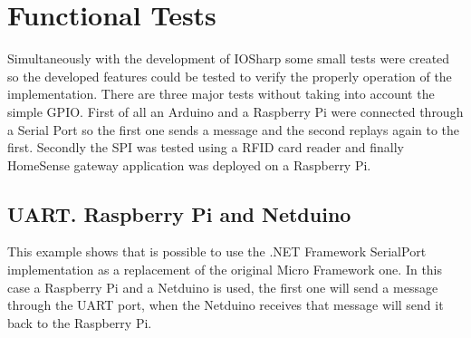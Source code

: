\chapter{Functional Tests}\label{C:Functional-Tests}
Simultaneously with the development of IOSharp some small tests were created so the developed features could be tested to verify the properly operation of the implementation. There are three major tests without taking into account the simple GPIO. First of all an Arduino and a Raspberry Pi were connected through a Serial Port so the first one sends a message and the second replays again to the first. Secondly the SPI was tested using a RFID card reader and finally HomeSense gateway application was deployed on a Raspberry Pi.

\section{UART. Raspberry Pi and Netduino}\label{S:IOEx-UART}
This example shows that is possible to use the .NET Framework SerialPort implementation as a replacement of the original Micro Framework one. In this case a Raspberry Pi and a Netduino is used, the first one will send a message through the UART port, when the Netduino receives that message will send it back to the Raspberry Pi.


